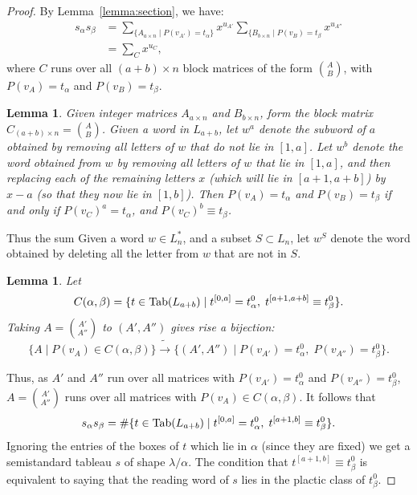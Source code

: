 \documentclass[11pt]{amsart}
\newtheorem{lemma}[theorem]{Lemma}
\theoremstyle{definition}
\theoremstyle{example}
\newcommand{\Tab}{\textup{Tab}}
\begin{document}
\begin{proof}
  By Lemma~\ref{lemma:section}, we have:
  \begin{align}
    \nonumber s_\alpha s_\beta & = \sum_{\{A_{a\times n}\mid P(v_{A'}) = t_\alpha\}} x^{u_{A'}} \sum_{\{B_{b\times n}\mid P(v_B) = t_\beta} x^{u_{A''}}\\
    \label{eq:sum-C} & = \sum_C x^{u_C},
  \end{align}
  where $C$ runs over all $(a+b)\times n$ block matrices of the form $\binom AB$, with $P(v_A)=t_\alpha$ and $P(v_B)=t_\beta$.
  \begin{lemma}
    Given integer matrices $A_{a\times n}$ and $B_{b\times n}$, form the block matrix $C_{(a+b)\times n} = \binom AB$.
    Given a word in $L_{a+b}$, let $w^a$ denote the subword of $a$ obtained by removing all letters of $w$ that do not lie in $[1, a]$.
    Let $w^b$ denote the word obtained from $w$ by removing all letters of $w$ that lie in $[1,a]$, and then replacing each of the remaining letters $x$ (which will lie in $[a+1, a+b]$) by $x-a$ (so that they now lie in $[1, b]$).
    Then $P(v_A) = t_\alpha$ and $P(v_B) = t_\beta$ if and only if $P(v_C)^a = t_\alpha$, and $P(v_C)^b \equiv t_\beta$.
  \end{lemma}
  Thus the sum 
  Given a word $w\in L_n^*$, and a subset $S\subset L_n$, let $w^S$ denote the word obtained by deleting all the letter from $w$ that are not in $S$.
  \begin{lemma}
    Let 
    \begin{displaymath}
      C(\alpha,\beta) = \{t\in \Tab(L_{a+b}) \mid t^{[0, a]} = t^0_\alpha,\;t^{[a+1, a+b]} \equiv t^0_\beta\}.
    \end{displaymath}
    Taking $A = \binom{A'}{A''}$ to $(A', A'')$ gives rise a bijection:
    \begin{displaymath}
      \{A\mid P(v_A) \in C(\alpha,\beta)\} \tilde\to \{(A', A'')\mid P(v_{A'}) = t^0_\alpha,\; P(v_{A''}) = t^0_\beta\}.
    \end{displaymath}
  \end{lemma}
  Thus, as $A'$ and $A''$ run over all matrices with $P(v_{A'})=t^0_\alpha$ and $P(v_{A''})=t^0_\beta$, $A=\binom{A'}{A''}$ runs over all matrices with $P(v_A)\in C(\alpha,\beta)$.
  It follows that
  \begin{displaymath}
    s_\alpha s_\beta = \#\{t\in \Tab(L_{a+b})\mid t^{[0,a]} = t^0_\alpha,\; t^{[a+1,b]}\equiv t^0_\beta\}.
  \end{displaymath}
  Ignoring the entries of the boxes of $t$ which lie in $\alpha$ (since they are fixed) we get a semistandard tableau $s$ of shape $\lambda/\alpha$.
  The condition that $t^{[a+1,b]}\equiv t^0_\beta$ is equivalent to saying that the reading word of $s$ lies in the plactic class of $t^0_\beta$.
\end{proof}
\end{document}
